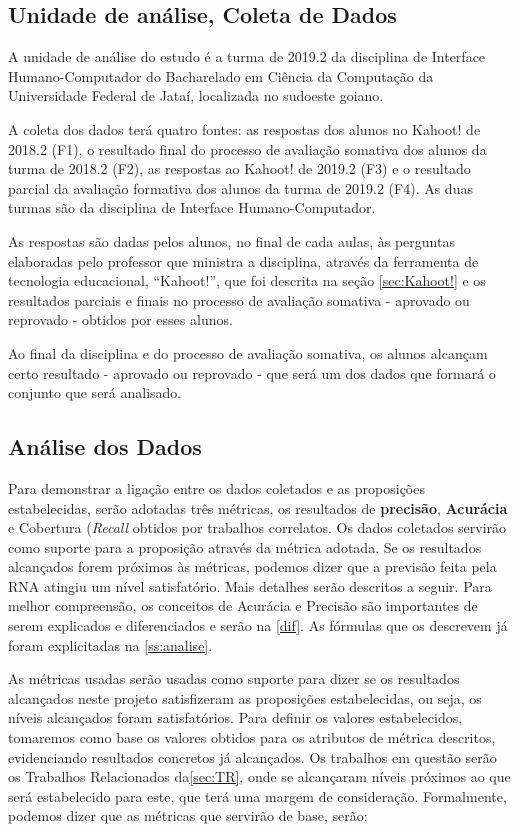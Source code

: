 \documentclass[
	12pt,				%
	openright,			%
	oneside,
	a4paper,			%
	english,			%
	french,				%
	spanish,			%
	brazil,				%
	]{abntex2}
\begin{document}
\subsection{Unidade de análise, Coleta de Dados}
A unidade de análise do estudo é a turma de 2019.2 da disciplina de Interface Humano-Computador do Bacharelado em Ciência da Computação da Universidade Federal de Jataí, localizada no sudoeste goiano.

A coleta dos dados terá quatro fontes: as respostas dos alunos no Kahoot! de 2018.2 (F1), o resultado final do processo de avaliação somativa dos alunos da turma de 2018.2 (F2), as respostas ao Kahoot! de 2019.2 (F3) e o resultado parcial da avaliação formativa dos alunos da turma de 2019.2 (F4). As duas turmas são da disciplina de Interface Humano-Computador. 

As respostas são dadas pelos alunos, no final de cada aulas, às perguntas elaboradas pelo professor que ministra a disciplina, através da ferramenta de tecnologia educacional, ``Kahoot!'', que foi descrita na seção \ref{sec:Kahoot!} e os resultados parciais e finais no processo de avaliação somativa - aprovado ou reprovado - obtidos por esses alunos.

Ao final da disciplina e do processo de avaliação somativa, os alunos alcançam certo resultado - aprovado ou reprovado - que será um dos dados que formará o conjunto que será analisado.

\subsection{Análise dos Dados}
Para demonstrar a ligação entre os dados coletados e as proposições estabelecidas, serão adotadas três métricas, os resultados de \textbf{precisão}, \textbf{Acurácia} e Cobertura (\textit{Recall} obtidos por trabalhos correlatos. Os dados coletados servirão como suporte para a proposição através da métrica adotada. Se os resultados alcançados forem próximos às métricas, podemos dizer que a previsão feita pela RNA atingiu um nível satisfatório. Mais detalhes serão descritos a seguir. Para melhor compreensão, os conceitos de Acurácia e Precisão são importantes de serem explicados e diferenciados e serão na \autoref{dif}. As fórmulas que os descrevem já foram explicitadas na \autoref{ss:analise}.

As métricas usadas serão usadas como suporte para dizer se os resultados alcançados neste projeto satisfizeram as proposições estabelecidas, ou seja, os níveis alcançados foram satisfatórios. Para definir os valores estabelecidos, tomaremos como base os valores obtidos para os atributos de métrica descritos, evidenciando resultados concretos já alcançados. Os trabalhos em questão serão os Trabalhos Relacionados da\autoref{sec:TR}, onde se alcançaram níveis próximos ao que será estabelecido para este, que terá uma margem de consideração. Formalmente, podemos dizer que as métricas que servirão de base, serão:
\end{document}

